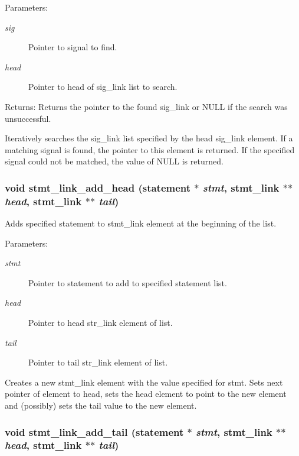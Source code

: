 \begin{Desc}
\item[Parameters:]
\begin{description}
\item[{\em sig}]Pointer to signal to find. \item[{\em head}]Pointer to head of sig\_\-link list to search. \end{description}
\end{Desc}
\begin{Desc}
\item[Returns:]Returns the pointer to the found sig\_\-link or NULL if the search was unsuccessful.\end{Desc}
Iteratively searches the sig\_\-link list specified by the head sig\_\-link element. If a matching signal is found, the pointer to this element is returned. If the specified signal could not be matched, the value of NULL is returned. 
\subsubsection{\setlength{\rightskip}{0pt plus 5cm}void stmt\_\-link\_\-add\_\-head ({\bf statement} $\ast$ {\em stmt}, {\bf stmt\_\-link} $\ast$$\ast$ {\em head}, {\bf stmt\_\-link} $\ast$$\ast$ {\em tail})}\label{link_8c_a1}


Adds specified statement to stmt\_\-link element at the beginning of the list. 

\begin{Desc}
\item[Parameters:]
\begin{description}
\item[{\em stmt}]Pointer to statement to add to specified statement list. \item[{\em head}]Pointer to head str\_\-link element of list. \item[{\em tail}]Pointer to tail str\_\-link element of list.\end{description}
\end{Desc}
Creates a new stmt\_\-link element with the value specified for stmt. Sets next pointer of element to head, sets the head element to point to the new element and (possibly) sets the tail value to the new element. 
\subsubsection{\setlength{\rightskip}{0pt plus 5cm}void stmt\_\-link\_\-add\_\-tail ({\bf statement} $\ast$ {\em stmt}, {\bf stmt\_\-link} $\ast$$\ast$ {\em head}, {\bf stmt\_\-link} $\ast$$\ast$ {\em tail})}\label{link_8c_a2}



